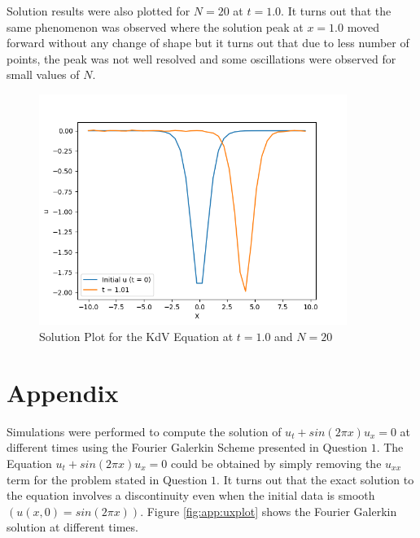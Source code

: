 \documentclass[12pt,dvipsnames]{article}
\newcommand{\an}[1]{{\leavevmode\color{BrickRed}{#1}}}
\begin{document}
Solution results were also plotted for $N = 20$ at $t = 1.0$. It turns out that the same phenomenon was observed where the solution peak at $x = 1.0$ moved forward without any change of shape but it turns out that due to less number of points, the peak was not well resolved and some oscillations were observed for small values of $N$.
\begin{figure}
    \centering
    \includegraphics[width = 10cm]{solutionPlot_N=20t = 1.01.png}
    \caption{Solution Plot for the KdV Equation at $t = 1.0$ and $N = 20$}
    \label{fig:Q2_N=64,t=1}
\end{figure}

\section{Appendix}
Simulations were performed to compute the solution of $u_t + sin(2 \pi x)u_x = 0$ at different times using the Fourier Galerkin Scheme presented in Question $1$. The Equation $u_t + sin(2 \pi x)u_x = 0$ could be obtained by simply removing the $u_{xx}$ term for the problem stated in Question $1$. It turns out that the exact solution to the equation involves a discontinuity even when the initial data is smooth $(u(x, 0) = sin(2 \pi x))$. Figure \ref{fig:app:uxplot} shows the Fourier Galerkin solution at different times. \an{This is not true -- the solution actually remains smooth, but the transition region simply becomes smaller and smaller; when it's too small, a truncated Fourier series simply cannot represent such things accurately. The reason you develop oscillations is due to the fact that for the true (infinite-dimensional) solution, those oscillations would be counteracted with oscillations from basis functions outside the Galerkin space. But since those modes are truncated, the oscillations are apparent. (You mention something similar to this below.)}
\end{document}
